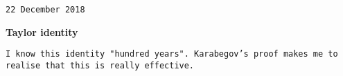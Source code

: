 

\baselineskip=14pt
\def\vare {\varepsilon}
\def\A {{\bf A}}
\def\t {\tilde}
\def\a {\alpha}
\def\K {{\bf K}}
\def\N {{\bf N}}
\def\V {{\cal V}}
\def\s {{\sigma}}
\def\S {{\Sigma}}
\def\s {{\sigma}}
\def\p{\partial}
\def\vare{{\varepsilon}}
\def\Q {{\bf Q}}
\def\D {{\cal D}}
\def\G {{\Gamma}}
\def\C {{\bf C}}
\def\M {{\cal M}}
\def\Z {{\bf Z}}
\def\U  {{\cal U}}
\def\H {{\cal H}}
\def\R  {{\bf R}}
\def\S  {{\bf S}}
\def\E  {{\bf E}}
\def\l {\lambda}
\def\ll {{\bf l}}
\def\degree {{\bf {\rm degree}\,\,}}
\def \finish {${\,\,\vrule height1mm depth2mm width 8pt}$}
\def \m {\medskip}
\def\p {\partial}
\def\r {{\bf r}}
\def\pt {{\bf p}}
\def\v {{\bf v}}
\def\n {{\bf n}}
\def\t {{\bf t}}
\def\b {{\bf b}}
\def\c {{\bf c }}
\def\e{{\bf e}}
\def\ac {{\bf a}}
\def \X   {{\bf X}}
\def \Y   {{\bf Y}}
\def \x   {{\bf x}}
\def \y   {{\bf y}}
\def \G{{\cal G}}
\def\w {{\omega}}
\def \Tr  {{\rm Tr\,}}
\def\V {{\cal V}}
\def\s {{d\over dt}}
\def \finish {${\,\,\vrule height1mm depth2mm width 8pt}$}


{\tt 22 December 2018}
\medskip

\centerline {\bf Taylor identity}

{\tt I know this identity "hundred  years". 
Karabegov's proof makes me to realise that
this is really effective.}

\medskip


